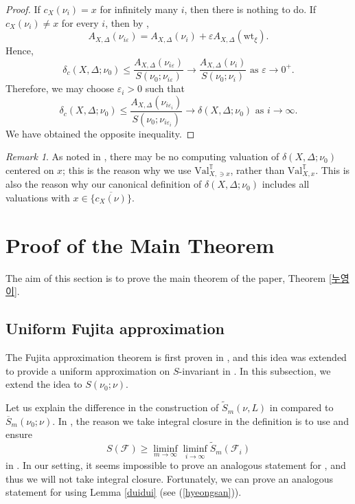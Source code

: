 \documentclass[a4paper,12pt]{amsart}
\theoremstyle{definition} %
\theoremstyle{remark}
\newtheorem{remark}[theorem]{Remark}
\numberwithin{equation}{section}
\begin{document}
\begin{proof}
\smallskip

If $c_X(\nu_i)=x$ for infinitely many $i$, then there is nothing to do. If $c_X(\nu_i)\ne x$ for every $i$, then by \cite[Lemma 2.8]{LW24},
$$ A_{X,\Delta}(\nu_{i\varepsilon})=A_{X,\Delta}(\nu_i)+\varepsilon A_{X,\Delta}(\mathrm{wt}_{\xi}).$$
Hence,
$$ \delta_c(X,\Delta;\nu_0)\le \frac{A_{X,\Delta}(\nu_{i\varepsilon})}{S(\nu_0;\nu_{i\varepsilon})}\to \frac{A_{X,\Delta}(\nu_i)}{S(\nu_0;\nu_i)}\text{ as }\varepsilon\to 0^+.$$
Therefore, we may choose $\varepsilon_i>0$ such that
$$\delta_c(X,\Delta;\nu_0)\le \frac{A_{X,\Delta}(\nu_{i\varepsilon_i})}{S(\nu_0;\nu_{i\varepsilon_i})}\to \delta(X,\Delta;\nu_0)\text{ as }i\to \infty. $$
We have obtained the opposite inequality.
\end{proof}

\begin{remark} \label{pohang}
As noted in \cite[Remark 3.7]{Wan25}, there may be no computing valuation of $\delta(X,\Delta;\nu_0)$ centered on $x$; this is the reason why we use $\mathrm{Val}^{\mathbb{T}}_{X,\ni x}$, rather than $\mathrm{Val}^{\mathbb{T}}_{X,x}$. This is also the reason why our canonical definition of $\delta(X,\Delta;\nu_0)$ includes all valuations with $x\in \overline{\{c_X(\nu)\}}$.
\end{remark}

\section{Proof of the Main Theorem} \label{3}

The aim of this section is to prove the main theorem of the paper, Theorem \ref{누영이}.

\subsection{Uniform Fujita approximation}

The Fujita approximation theorem is first proven in \cite{Fuj94}, and this idea was extended to provide a uniform approximation on $S$-invariant in \cite[Section 5]{BJ20}. In this subsection, we extend the idea to $S(\nu_0;\nu)$.

\smallskip

Let us explain the difference in the construction of $\tilde{S}_m(\nu,L)$ in \cite[Section 5]{BJ20} compared to $\overline{S}_m(\nu_0;\nu)$. In \cite[Section 5]{BJ20}, the reason we take integral closure in the definition is to use \cite[Proposition 6.3]{BJ20} and ensure
$$ S(\mathcal{F})\ge \liminf_{m\to \infty}\liminf_{i\to \infty}\tilde{S}_m(\mathcal{F}_i)$$
in \cite[Proposition 6.7]{BJ20}. In our setting, it seems impossible to prove an analogous statement for \cite[Proposition 6.3]{BJ20}, and thus we will not take integral closure. Fortunately, we can prove an analogous statement for \cite[Proposition 6.7]{BJ20} using Lemma \ref{duidui} (see (\ref{hyeongsan})).
\end{document}
